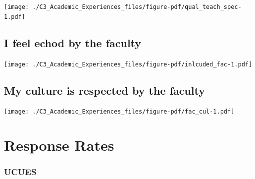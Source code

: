 \documentclass[
  letterpaper,
  DIV=11,
  numbers=noendperiod]{scrreprt}
\begin{document}
\texttt{[image: ./C3\_Academic\_Experiences\_files/figure-pdf/qual\_teach\_spec-1.pdf]}

\hypertarget{i-feel-echod-by-the-faculty}{%
\subsection{I feel echod by the
faculty}\label{i-feel-echod-by-the-faculty}}

\texttt{[image: ./C3\_Academic\_Experiences\_files/figure-pdf/inlcuded\_fac-1.pdf]}

\hypertarget{my-culture-is-respected-by-the-faculty}{%
\subsection{My culture is respected by the
faculty}\label{my-culture-is-respected-by-the-faculty}}

\texttt{[image: ./C3\_Academic\_Experiences\_files/figure-pdf/fac\_cul-1.pdf]}

\hypertarget{response-rates}{%
\section{Response Rates}\label{response-rates}}

\hypertarget{ucues}{%
\subsubsection{UCUES}\label{ucues}}
\end{document}
